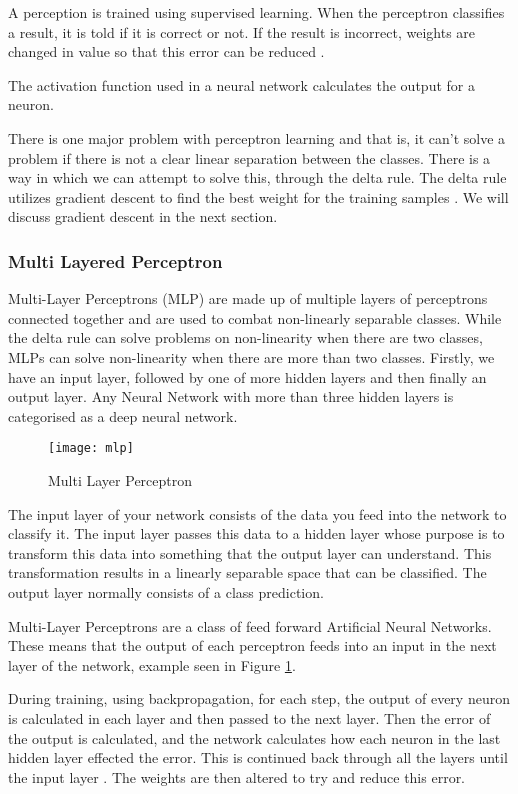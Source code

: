 A perception is trained using supervised learning. When the perceptron
classifies a result, it is told if it is correct or not. If the result is
incorrect, weights are changed in value so that this error can be reduced
\parencite{AI}. 

The activation function used in a neural network calculates the output for a neuron.

There is one major problem with perceptron learning and that is, it can't solve
a problem if there is not a clear linear separation between the classes. There
is a way in which we can attempt to solve this, through the delta rule. The
delta rule utilizes gradient descent to find the best weight for the training
samples \parencite{MLANN}. We will discuss gradient descent in the next section.

\tocless\subsubsection{Multi Layered Perceptron}
Multi-Layer Perceptrons (MLP) are made up of multiple layers of perceptrons connected
together and are used to combat non-linearly separable classes.
While the delta rule can solve problems on non-linearity when there are two classes, MLPs can solve non-linearity when there are more than two classes.
Firstly, we have an input layer, followed by one of more hidden layers and then
finally an output layer.
Any Neural Network with more than three hidden layers is categorised as a deep neural network.

\begin{figure}[h]
	\centering
    \texttt{[image: mlp]}
    \caption{Multi Layer Perceptron}
    \label{fig:mlp}
\end{figure}

The input layer of your network consists of the data you feed into the network to classify it. The input layer passes this data to a hidden layer
whose purpose is to transform this data into something that the output layer can
understand. This transformation results in a linearly separable space that can be classified. The output layer normally consists of a class prediction.

Multi-Layer Perceptrons are a class of feed forward Artificial Neural Networks.
These means that the output of each perceptron feeds into an input in the next
layer of the network, example seen in Figure \ref{fig:mlp}.

During training, using backpropagation, for each step, the output of every neuron is calculated in each layer and then passed to the next layer. Then the error of the output is calculated, and the network calculates how each neuron in the last hidden layer effected the error. This is continued back through all the layers until the input layer \parencite{handsOnML}. The weights are then altered to try and reduce this error.

